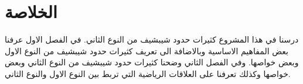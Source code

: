 \chapter*{الخلاصة}

درسنا في هذا المشروع كثيرات حدود شيبشيف من النوع الثاني. في الفصل الاول عرفنا بعض المفاهيم الاساسية وبالاضافة الى تعريف كثيرات حدود شيبشيف من النوع الاول وبعض خواصها. وفي الفصل الثاني وضحنا كثيرات حدود شيبشيف من النوع الثاني وبعض خواصها وكذلك تعرفنا على العلاقات الرياضية التي تربط بين النوع الاول والنوع الثاني.

